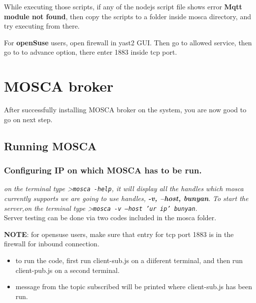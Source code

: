 \documentclass[16pt]{article}
\begin{document}
While executing those scripts, if any of the nodejs script file shows
error \textbf{Mqtt module not found}, then copy the scripts to a folder
inside mosca directory, and try executing from there.

For \textbf{openSuse} users, open firewall in yast2 GUI. Then go to
allowed service, then go to to advance option, there enter 1883 inside
tcp port.


\vspace{13cm}

\section{MOSCA broker}

\vspace{0.5cm}

After successfully installing MOSCA broker on the system, you are now
good to go on next step.

\vspace{0.5cm}
\subsection{Running MOSCA}

\vspace{0.3cm}



\subsubsection{Configuring IP on which MOSCA has to be run.}

\emph{on the terminal type \textgreater{}\texttt{mosca -help}, it will
display all the handles which mosca currently supports we are going to
use handles, {\textbf{-v, --host, \textbar{} bunyan}}}. \emph{To start the server,on
the terminal type \textgreater{}\texttt{mosca -v --host 'ur ip'
\textbar{}bunyan}}. \\ Server testing can be done via two codes included in
the mosca folder.

 

\vspace{0.3cm}

\textbf{NOTE}: for opensuse users, make sure that entry for tcp port
1883 is in the firewall for inbound connection.

\begin{itemize}

\item
  to run the code, first run client-sub.js on a diiferent terminal, and
  then run client-pub.js on a second terminal.
\item
  message from the topic subscribed will be printed where client-sub.js
  has been run.
\end{itemize}
\end{document}
